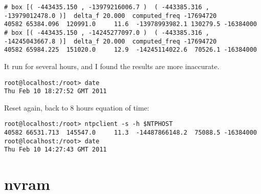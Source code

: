 \documentclass[a4paper]{report}
\begin{document}
\begin{enumerate}
\begin{lstlisting}
# box [( -443435.150 , -13979216006.7 )  ( -443385.316 , -13979012478.0 )]  delta_f 20.000  computed_freq -17694720
40582 65384.096  120991.0     11.6  -13978993982.1 130279.5 -16384000
# box [( -443435.150 , -14245277097.0 )  ( -443385.316 , -14245043667.8 )]  delta_f 20.000  computed_freq -17694720
40582 65984.225  151020.0     12.9  -14245114022.6  70526.1 -16384000
\end{lstlisting}
It run for several hours, and I found the results are more inaccurate.
\begin{lstlisting}
root@localhost:/root> date
Thu Feb 10 18:27:52 GMT 2011
\end{lstlisting}
Reset again, back to 8 hours equation of time:
\begin{lstlisting}
root@localhost:/root> ntpclient -s -h $NTPHOST
40582 66531.713  145547.0     11.3  -14487866148.2  75088.5 -16384000
root@localhost:/root> date
Thu Feb 10 14:27:43 GMT 2011
\end{lstlisting}


\chapter{nvram}

\end{enumerate}
\end{document}
